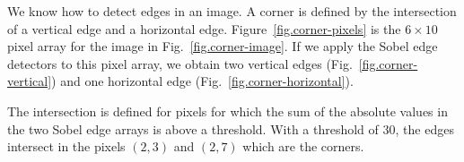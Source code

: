 We know how to detect edges in an image. A corner is defined by the intersection of a vertical edge and a horizontal edge. Figure~\ref{fig.corner-pixels} is the $6\times 10$ pixel array for the image in Fig.~\ref{fig.corner-image}. If we apply the Sobel edge detectors to this pixel array, we obtain two vertical edges (Fig.~\ref{fig.corner-vertical}) and one horizontal edge (Fig.~\ref{fig.corner-horizontal}).

The intersection is defined for pixels for which the sum of the absolute values in the two Sobel edge arrays is above a threshold. With a threshold of $30$, the edges intersect in the pixels $(2,3)$ and $(2,7)$ which are the corners.

\begin{figure}
\subfigures
\begin{minipage}{\textwidth}
\end{minipage}
\end{figure}
